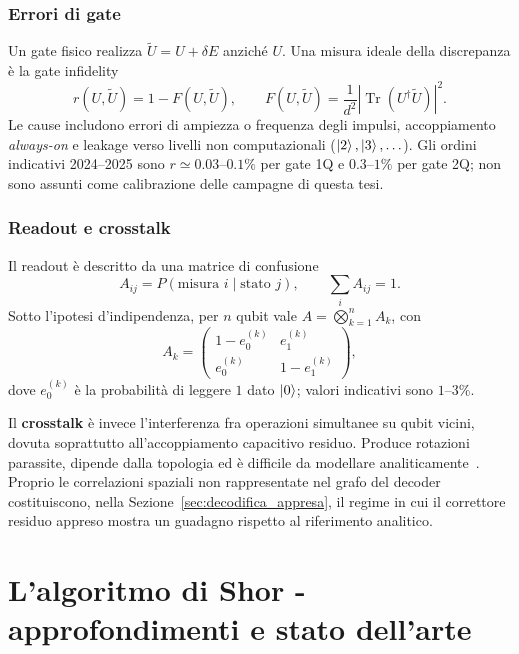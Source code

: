 \subsubsection{Errori di gate}

Un gate fisico realizza $\widetilde U=U+\delta E$ anziché $U$. Una misura
ideale della discrepanza è la gate infidelity
\begin{equation}
 r(U,\widetilde U)=1-F(U,\widetilde U),\qquad
 F(U,\widetilde U)=\frac{1}{d^2}
 \left|\operatorname{Tr}(U^\dagger\widetilde U)\right|^2.
\end{equation}
Le cause includono errori di ampiezza o frequenza degli impulsi, accoppiamento
\emph{always-on} e leakage verso livelli non computazionali
($\ket{2},\ket{3},\ldots$). Gli ordini indicativi 2024--2025 sono
$r\simeq0.03$--$0.1\%$ per gate 1Q e $0.3$--$1\%$ per gate 2Q; non sono
assunti come calibrazione delle campagne di questa tesi.

\subsubsection{Readout e crosstalk}

Il readout è descritto da una matrice di confusione
\begin{equation}
 A_{ij}=P(\text{misura }i\mid\text{stato }j),\qquad
 \sum_iA_{ij}=1.
\end{equation}
Sotto l'ipotesi d'indipendenza, per $n$ qubit vale
$A=\bigotimes_{k=1}^nA_k$, con
\begin{equation}
 A_k=\begin{pmatrix}
 1-e_0^{(k)}&e_1^{(k)}\\ e_0^{(k)}&1-e_1^{(k)}
 \end{pmatrix},
\end{equation}
dove $e_0^{(k)}$ è la probabilità di leggere $1$ dato $\ket{0}$; valori
indicativi sono $1$--$3\%$.

Il \textbf{crosstalk} è invece l'interferenza fra operazioni simultanee su
qubit vicini, dovuta soprattutto all'accoppiamento capacitivo residuo. Produce
rotazioni parassite, dipende dalla topologia ed è difficile da modellare
analiticamente~\cite{sarovar2020}. Proprio le correlazioni spaziali non
rappresentate nel grafo del decoder costituiscono, nella
Sezione~\ref{sec:decodifica_appresa}, il regime in cui il correttore residuo
appreso mostra un guadagno rispetto al riferimento analitico.


\section{L'algoritmo di Shor - approfondimenti e stato dell'arte}
\label{app:shor_esteso}

